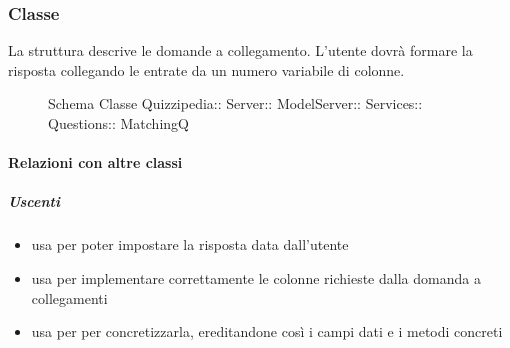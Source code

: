 \subsubsection{Classe }
La struttura descrive le domande a collegamento. L'utente dovrà formare la risposta collegando le entrate da un numero variabile di colonne.
\begin{figure}[H]
\centering
\noindent{}
\caption[Schema Classe MatchingQ]{Schema Classe Quizzipedia:: Server:: ModelServer:: Services:: Questions:: MatchingQ}
\end{figure}
\paragraph{Relazioni con altre classi}
\subparagraph{Uscenti}
\begin{itemize}
\item usa  per poter impostare la risposta data dall'utente
\item usa  per implementare correttamente le colonne richieste dalla domanda a collegamenti
\item usa  per per concretizzarla, ereditandone così i campi dati e i metodi concreti
\end{itemize}

